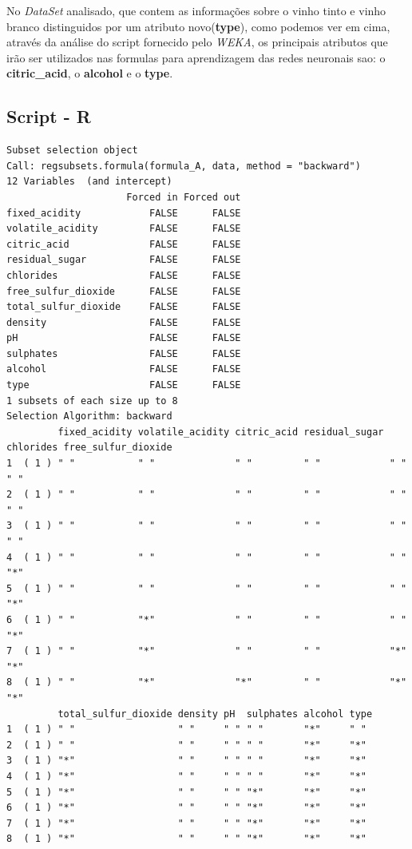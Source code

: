 \documentclass{report}
\begin{document}
No \textit{DataSet} analisado, que contem as informações sobre o vinho tinto e vinho branco distinguidos por um atributo novo(\textbf{type}), como podemos ver em cima, através da análise do script fornecido pelo \textit{WEKA}, os principais atributos que irão ser utilizados nas formulas para aprendizagem das redes neuronais sao: o \textbf{citric\_acid}, o \textbf{alcohol} e o \textbf{type}.

\subsection{Script - R}
\begin{verbatim}
Subset selection object
Call: regsubsets.formula(formula_A, data, method = "backward")
12 Variables  (and intercept)
                     Forced in Forced out
fixed_acidity            FALSE      FALSE
volatile_acidity         FALSE      FALSE
citric_acid              FALSE      FALSE
residual_sugar           FALSE      FALSE
chlorides                FALSE      FALSE
free_sulfur_dioxide      FALSE      FALSE
total_sulfur_dioxide     FALSE      FALSE
density                  FALSE      FALSE
pH                       FALSE      FALSE
sulphates                FALSE      FALSE
alcohol                  FALSE      FALSE
type                     FALSE      FALSE
1 subsets of each size up to 8
Selection Algorithm: backward
         fixed_acidity volatile_acidity citric_acid residual_sugar chlorides free_sulfur_dioxide
1  ( 1 ) " "           " "              " "         " "            " "       " "                
2  ( 1 ) " "           " "              " "         " "            " "       " "                
3  ( 1 ) " "           " "              " "         " "            " "       " "                
4  ( 1 ) " "           " "              " "         " "            " "       "*"                
5  ( 1 ) " "           " "              " "         " "            " "       "*"                
6  ( 1 ) " "           "*"              " "         " "            " "       "*"                
7  ( 1 ) " "           "*"              " "         " "            "*"       "*"                
8  ( 1 ) " "           "*"              "*"         " "            "*"       "*"                
         total_sulfur_dioxide density pH  sulphates alcohol type
1  ( 1 ) " "                  " "     " " " "       "*"     " " 
2  ( 1 ) " "                  " "     " " " "       "*"     "*" 
3  ( 1 ) "*"                  " "     " " " "       "*"     "*" 
4  ( 1 ) "*"                  " "     " " " "       "*"     "*" 
5  ( 1 ) "*"                  " "     " " "*"       "*"     "*" 
6  ( 1 ) "*"                  " "     " " "*"       "*"     "*" 
7  ( 1 ) "*"                  " "     " " "*"       "*"     "*" 
8  ( 1 ) "*"                  " "     " " "*"       "*"     "*" 
\end{verbatim}
\end{document}
